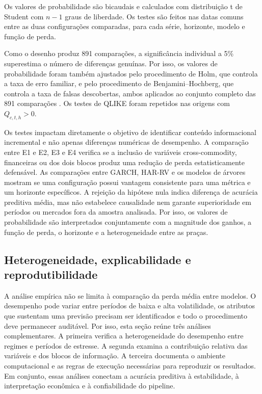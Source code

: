 \documentclass[a4paper,fleqn]{cas-sc}
\begin{document}
Os valores de probabilidade são bicaudais e calculados com distribuição t de Student com \(n-1\) graus de liberdade. Os testes são feitos nas datas comuns entre as duas configurações comparadas, para cada série, horizonte, modelo e função de perda.

Como o desenho produz 891 comparações, a significância individual a 5\% superestima o número de diferenças genuínas. Por isso, os valores de probabilidade foram também ajustados pelo procedimento de Holm, que controla a taxa de erro familiar, e pelo procedimento de Benjamini--Hochberg, que controla a taxa de falsas descobertas, ambos aplicados ao conjunto completo das 891 comparações \citep{Holm1979,BenjaminiHochberg1995}. Os testes de QLIKE foram repetidos nas origens com \(Q_{c,t,h}>0\).

Os testes impactam diretamente o objetivo de identificar conteúdo informacional incremental e não apenas diferenças numéricas de desempenho. A comparação entre E1 e E2, E3 e E4 verifica se a inclusão de variáveis cross-commodity, financeiras ou dos dois blocos produz uma redução de perda estatisticamente defensável. As comparações entre GARCH, HAR-RV e os modelos de árvores mostram se uma configuração possui vantagem consistente para uma métrica e um horizonte específicos. A rejeição da hipótese nula indica diferença de acurácia preditiva média, mas não estabelece causalidade nem garante superioridade em períodos ou mercados fora da amostra analisada. Por isso, os valores de probabilidade são interpretados conjuntamente com a magnitude dos ganhos, a função de perda, o horizonte e a heterogeneidade entre as praças.

\subsection{Heterogeneidade, explicabilidade e reprodutibilidade}
\label{subsec:additional_analyses}

A análise empírica não se limita à comparação da perda média entre modelos. O desempenho pode variar entre períodos de baixa e alta volatilidade, os atributos que sustentam uma previsão precisam ser identificados e todo o procedimento deve permanecer auditável. Por isso, esta seção reúne três análises complementares. A primeira verifica a heterogeneidade do desempenho entre regimes e períodos de estresse. A segunda examina a contribuição relativa das variáveis e dos blocos de informação. A terceira documenta o ambiente computacional e as regras de execução necessárias para reproduzir os resultados. Em conjunto, essas análises conectam a acurácia preditiva à estabilidade, à interpretação econômica e à confiabilidade do pipeline.
\end{document}
